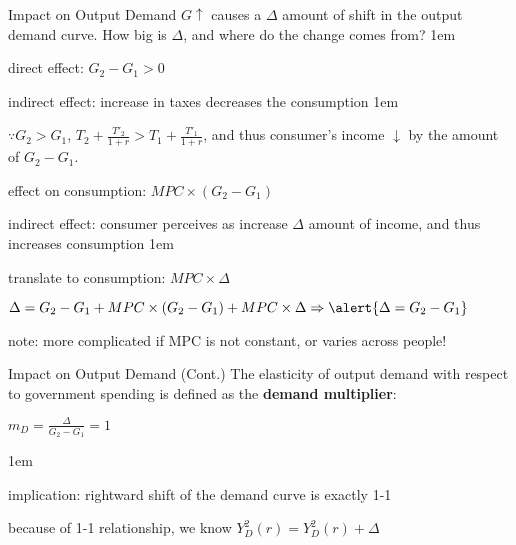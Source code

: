 \documentclass[11pt,aspectratio=43]{beamer}
\let\olditemize=\itemize
\let\endolditemize=\enditemize
\renewenvironment{itemize}{\olditemize \itemsep1em}{\endolditemize}
\let\oldenumerate=\enumerate
\let\endoldenumerate=\endenumerate
\renewenvironment{enumerate}{\oldenumerate \itemsep1em}{ \endoldenumerate}
\theoremstyle{definition}
\begin{document}
\begin{frame}{Impact on Output Demand}
\label{slide:Impact_on_Output_Demand}
    $ G \uparrow  $ causes \alert{a $ \Delta $ amount of shift in the output demand curve}. How big is $ \Delta $, and where do the change comes from?
    \begin{enumerate}
        \item direct effect: $ G_{2} - G_{1} > 0 $
        \item indirect effect: increase in taxes decreases the consumption
        \begin{itemize}
            \item $ \because G_{2} > G_{1} $, $ T_{2} + \frac{T'_{2}}{1+r} > T_{1} + \frac{T'_{1}}{1+r} $, and thus consumer's income $ \downarrow  $ by the amount of $ G_{2} - G_{1} $.
            \item effect on consumption: $ MPC \times ( G_{2} - G_{1} ) $
        \end{itemize}
        \item indirect effect: consumer perceives as increase $ \Delta $ amount of income, and thus increases consumption
        \begin{itemize}
            \item translate to consumption: $ MPC \times \Delta $
        \end{itemize}
    \end{enumerate}
    \begin{center}
        $ \displaystyle \Delta = G_{2} - G_{1} + MPC \times ( G_{2} - G_{1} ) + MPC \times \Delta \Rightarrow \alert{\Delta = G_{2} - G_{1}}$
    \end{center}
    note: more complicated if MPC is not constant, or varies across people!
\end{frame}

\begin{frame}{Impact on Output Demand (Cont.)}
\label{slide:Impact_on_Output_Demand__Cont__}
The \alert{elasticity} of output demand with respect to government spending is defined as the \textbf{demand multiplier}:
\begin{center}
    $ \displaystyle m_{D} = \frac{\Delta}{G_{2} - G_{1}} = 1 $
\end{center}
\begin{itemize}
    \item implication: rightward shift of the demand curve is exactly 1-1
    \item because of 1-1 relationship, we know \alert{$ Y_{D}^{2}( r ) = Y_{D}^{2}( r ) + \Delta $}
\end{itemize}

\end{frame}
\end{document}
